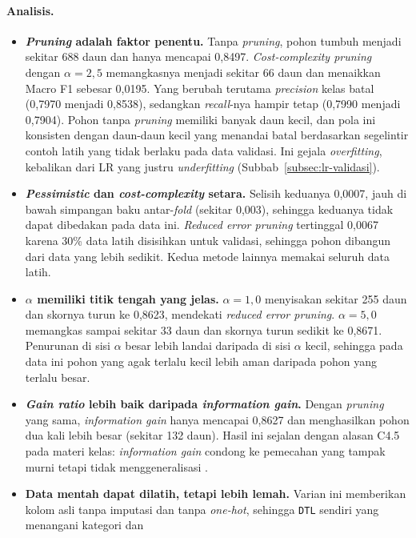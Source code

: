 \paragraph{Analisis.}
\begin{itemize}
	\item \textbf{\textit{Pruning} adalah faktor penentu.} Tanpa \textit{pruning}, pohon tumbuh
	menjadi sekitar 688 daun dan hanya mencapai 0,8497. \textit{Cost-complexity pruning} dengan
	$\alpha = 2{,}5$ memangkasnya menjadi sekitar 66 daun dan menaikkan Macro F1 sebesar 0,0195. Yang
	berubah terutama \textit{precision} kelas batal (0,7970 menjadi 0,8538), sedangkan
	\textit{recall}-nya hampir tetap (0,7990 menjadi 0,7904). Pohon tanpa \textit{pruning} memiliki
	banyak daun kecil, dan pola ini konsisten dengan daun-daun kecil yang menandai batal berdasarkan
	segelintir contoh latih yang tidak berlaku pada data validasi. Ini gejala \textit{overfitting}, kebalikan dari
	LR yang justru \textit{underfitting} (Subbab~\ref{subsec:lr-validasi}).
	\item \textbf{\textit{Pessimistic} dan \textit{cost-complexity} setara.} Selisih keduanya
	0,0007, jauh di bawah simpangan baku antar-\textit{fold} (sekitar 0,003), sehingga keduanya tidak
	dapat dibedakan pada data ini. \textit{Reduced error pruning} tertinggal 0,0067 karena 30\% data
	latih disisihkan untuk validasi, sehingga pohon dibangun dari data yang lebih sedikit. Kedua metode
	lainnya memakai seluruh data latih.
	\item \textbf{$\alpha$ memiliki titik tengah yang jelas.} $\alpha = 1{,}0$ menyisakan sekitar 255
	daun dan skornya turun ke 0,8623, mendekati \textit{reduced error pruning}. $\alpha = 5{,}0$
	memangkas sampai sekitar 33 daun dan skornya turun sedikit ke 0,8671. Penurunan di sisi $\alpha$
	besar lebih landai daripada di sisi $\alpha$ kecil, sehingga pada data ini pohon yang agak terlalu
	kecil lebih aman daripada pohon yang terlalu besar.
	\item \textbf{\textit{Gain ratio} lebih baik daripada \textit{information gain}.} Dengan
	\textit{pruning} yang sama, \textit{information gain} hanya mencapai 0,8627 dan menghasilkan pohon
	dua kali lebih besar (sekitar 132 daun). Hasil ini sejalan dengan alasan C4.5 pada materi kelas:
	\textit{information gain} condong ke pemecahan yang tampak murni tetapi tidak menggeneralisasi
	\cite{slide-dtl-issues}.
	\item \textbf{Data mentah dapat dilatih, tetapi lebih lemah.} Varian ini memberikan kolom asli tanpa
	imputasi dan tanpa \textit{one-hot}, sehingga \texttt{DTL} sendiri yang menangani kategori dan

\end{itemize}

